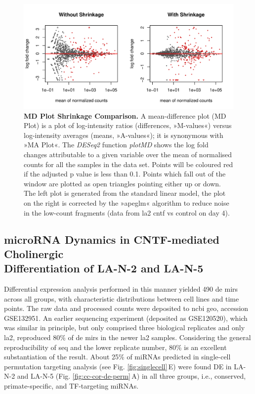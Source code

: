 \begin{figure}[ht]
\centering
\includegraphics[width=\textwidth]{figures/apeglm-comp-la2d4}
\caption[MD Plot Shrinkage Comparison.]{\textbf{MD Plot Shrinkage Comparison.} A mean-difference plot (MD Plot) is a plot of log-intensity ratios (differences, »M-values«) versus log-intensity averages (means, »A-values«); it is synonymous with »MA Plot«. The \textit{DESeq2} function \textit{plotMD} shows the log fold changes attributable to a given variable over the mean of normalised counts for all the samples in the data set. Points will be coloured red if the adjusted p value is less than 0.1. Points which fall out of the window are plotted as open triangles pointing either up or down. The left plot is generated from the standard linear model, the plot on the right is corrected by the »apeglm« algorithm\cite{Zhu2019} to reduce noise in the low-count fragments (data from \ac{la2} \ac{cntf} vs control on day 4).
\label{fig:apeglm-comp-la2d4}}
\end{figure}

\subsection{microRNA Dynamics in CNTF-mediated Cholinergic\\ Differentiation of LA-N-2 and LA-N-5}
Differential expression analysis performed in this manner yielded 490 \ac{de} \acp{mir} across all groups, with characteristic distributions between cell lines and time points. The raw data and processed counts were deposited to \ac{ncbi} \ac{geo}, accession GSE132951. An earlier sequencing experiment (deposited as GSE120520), which was similar in principle, but only comprised three biological replicates and only \ac{la2}, reproduced 80\% of \ac{de} \acp{mir} in the newer \ac{la2} samples. Considering the general reproducibility of \ac{seq} and the lower replicate number, 80\% is an excellent substantiation of the result. About 25\% of miRNAs predicted in single-cell permutation targeting analysis (see Fig. \ref{fig:singlecell}\,E) were found DE in LA-N-2 and LA-N-5 (Fig. \ref{fig:cc-cor-de-perm}\,A) in all three groups, i.e., conserved, primate-specific, and TF-targeting miRNAs.  

